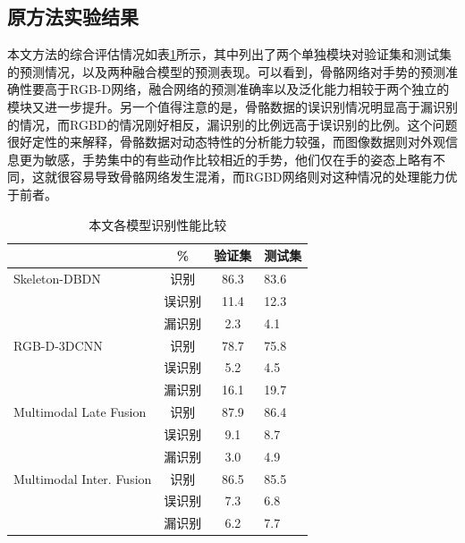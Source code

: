 \documentclass[a4paper, 12pt]{article}
\begin{document}
\subsection{原方法实验结果}
本文方法的综合评估情况如表\ref{tab:1}所示，其中列出了两个单独模块对验证集和测试集的预测情况，以及两种融合模型的预测表现。可以看到，骨骼网络对手势的预测准确性要高于RGB-D网络，融合网络的预测准确率以及泛化能力相较于两个独立的模块又进一步提升。另一个值得注意的是，骨骼数据的误识别情况明显高于漏识别的情况，而RGBD的情况刚好相反，漏识别的比例远高于误识别的比例。这个问题很好定性的来解释，骨骼数据对动态特性的分析能力较强，而图像数据则对外观信息更为敏感，手势集中的有些动作比较相近的手势，他们仅在手的姿态上略有不同，这就很容易导致骨骼网络发生混淆，而RGBD网络则对这种情况的处理能力优于前者。
\begin{table}[htbp]
 \caption{\label{tab:1}本文各模型识别性能比较}
 \centering
 \begin{tabular}{lccl}
  \toprule
    & \% & 验证集 & 测试集\\
  \midrule
 Skeleton-DBDN & 识别 & 86.3 & 83.6\\
               & 误识别 & 11.4 & 12.3\\
               & 漏识别 & 2.3 & 4.1\\
 RGB-D-3DCNN & 识别 & 78.7 & 75.8\\
               & 误识别 & 5.2 & 4.5\\
               & 漏识别 & 16.1 & 19.7\\
 Multimodal Late Fusion & 识别 & 87.9 & 86.4\\
               & 误识别 & 9.1 & 8.7\\
               & 漏识别 & 3.0 & 4.9\\
 Multimodal Inter. Fusion & 识别 & 86.5 & 85.5\\
               & 误识别 & 7.3 & 6.8\\
               & 漏识别 & 6.2 & 7.7\\
  \bottomrule
 \end{tabular}
\end{table}
\end{document}
